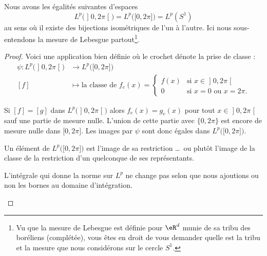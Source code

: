 \begin{proposition}
    Nous avons les égalités suivantes d'espaces
    \begin{equation}
    L^p\big( \mathopen] 0 , 2\pi \mathclose[ \big)=L^p\big( \mathopen[ 0 , 2\pi \mathclose] \big)=L^p(S^1)
    \end{equation}
    au sens où il existe des bijections isométriques de l'un à l'autre. Ici nous sous-entendons la mesure de Lebesgue partout\footnote{Vu que la mesure de Lebesgue est définie pour \( \eR^d\) munie de sa tribu des boréliens (complétée), vous êtes en droit de vous demander quelle est la tribu et la mesure que nous considérons sur le cercle \( S^1\).}.
\end{proposition}


\begin{proof}
    Voici une application bien définie où le crochet dénote la prise de classe :
    \begin{equation}
        \begin{aligned}
        \psi\colon L^p\big(\mathopen] 0 , 2\pi \mathclose[\big)&\to L^p\big(\mathopen[ 0 , 2\pi \mathclose]\big) \\
                [f]&\mapsto \text{la classe de } f_e(x)=\begin{cases}
                    f(x)    &   \text{si } x\in\mathopen] 0 , 2\pi \mathclose[\\
                    0    &    \text{si } x=0\text{ ou } x=2\pi.
                \end{cases}
        \end{aligned}
    \end{equation}
    \begin{subproof}
        \item[Injective]
            Si \( [f]=[g]\) dans \( L^p\big(\mathopen] 0 , 2\pi \mathclose[\big)\) alors \( f_e(x)=g_e(x)\) pour tout \( x\in \mathopen] 0 , 2\pi \mathclose[ \) sauf une partie de mesure nulle. L'union de cette partie avec \( \{ 0,2\pi \}\) est encore de mesure nulle dans \( \mathopen[ 0 , 2\pi \mathclose]\). Les images par \( \psi\) sont donc égales dans \( L^p\big( \mathopen[ 0 , 2\pi \mathclose] \big)\).
            \item[Surjective]
                Un élément de \( L^p\big( \mathopen[ 0 , 2\pi \mathclose] \big)\) est l'image de sa restriction \ldots\ ou plutôt l'image de la classe de la restriction d'un quelconque de ses représentants.
            \item[Isométrie]
                L'intégrale qui donne la norme sur \( L^p\) ne change pas selon que nous ajoutions ou non les bornes au domaine d'intégration.
    \end{subproof}


\end{proof}

